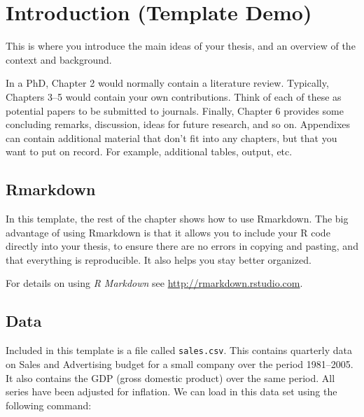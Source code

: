\documentclass{aucklandthesis}
\begin{document}
\clearpage{}\setcounter{page}{0}

\hypertarget{ch:intro}{%
\chapter{Introduction (Template Demo)}\label{ch:intro}}

This is where you introduce the main ideas of your thesis, and an overview of the context and background.

In a PhD, Chapter 2 would normally contain a literature review. Typically, Chapters 3--5 would contain your own contributions. Think of each of these as potential papers to be submitted to journals. Finally, Chapter 6 provides some concluding remarks, discussion, ideas for future research, and so on. Appendixes can contain additional material that don't fit into any chapters, but that you want to put on record. For example, additional tables, output, etc.

\hypertarget{rmarkdown}{%
\section{Rmarkdown}\label{rmarkdown}}

In this template, the rest of the chapter shows how to use Rmarkdown. The big advantage of using Rmarkdown is that it allows you to include your R code directly into your thesis, to ensure there are no errors in copying and pasting, and that everything is reproducible. It also helps you stay better organized.

For details on using \emph{R Markdown} see \url{http://rmarkdown.rstudio.com}.

\hypertarget{data}{%
\section{Data}\label{data}}

Included in this template is a file called \texttt{sales.csv}. This contains quarterly data on Sales and Advertising budget for a small company over the period 1981--2005. It also contains the GDP (gross domestic product) over the same period. All series have been adjusted for inflation. We can load in this data set using the following command:

\begin{Shaded}
\begin{Highlighting}[]
\StringTok{ }\NormalTok{(}\NormalTok{(}\NormalTok{)[, }\NormalTok{], } \NormalTok{, } \NormalTok{)}
\end{Highlighting}
\end{Shaded}
\end{document}
